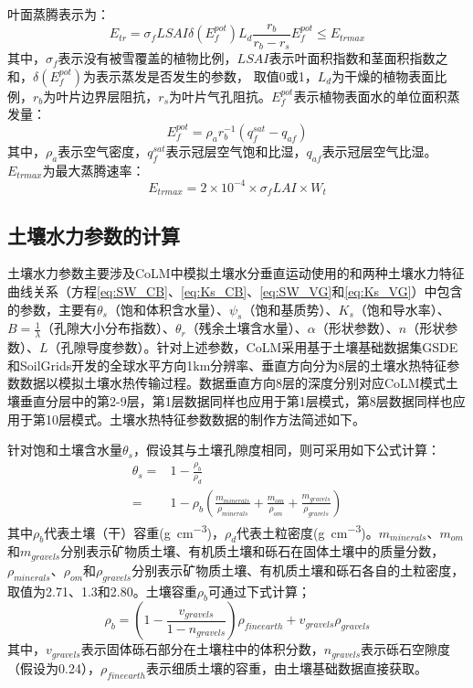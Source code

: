 叶面蒸腾表示为：
\begin{equation}
{E}_{{tr}}=\sigma_{{f}} LSAI \delta\left({E}_{{f}}^{{pot}}\right) {L}_{{d}} \frac{{r}_{{b}}}{{r}_{{b}}-{r}_{{s}}} {E}_{{f}}^{{pot}} \leq {E}_{{trmax}}
\end{equation}
其中，$\sigma_f$表示没有被雪覆盖的植物比例，$LSAI$表示叶面积指数和茎面积指数之和，$\delta\left(E_f^{pot}\right)$为表示蒸发是否发生的参数，
取值0或1，$L_d$为干燥的植物表面比例，$r_b$为叶片边界层阻抗，$r_s$为叶片气孔阻抗。$E_f^{pot}$表示植物表面水的单位面积蒸发量：
\begin{equation}
{E}_{{f}}^{{pot}}=\rho_{{a}} {r}_{{b}}^{-1}\left({q}_{{f}}^{{sat}}-{q}_{{af}}\right)
\end{equation}
其中，$\rho_a$表示空气密度，$q_f^{sat}$表示冠层空气饱和比湿，$q_{af}$表示冠层空气比湿。$E_{trmax}$为最大蒸腾速率：
\begin{equation}
{E}_{ {trmax }}=2 \times 10^{-4} \times \sigma_{{f}} L A I \times W_{t}
\end{equation}

\subsection{土壤水力参数的计算}\label{sec_hydropar}
土壤水力参数主要涉及CoLM中模拟土壤水分垂直运动使用的\citet{campbell1974}和\citet{van1980closed}两种土壤水力特征曲线关系（方程\ref{eq:SW_CB}、\ref{eq:Ks_CB}、\ref{eq:SW_VG}和\ref{eq:Ks_VG}）中包含的参数，主要有$\theta_s$（饱和体积含水量）、$\psi_s$（饱和基质势）、$K_s$（饱和导水率）、$B=\frac{1}{\lambda}$（孔隙大小分布指数）、$\theta_r$（残余土壤含水量）、$\alpha$（形状参数）、$n$（形状参数）、$L$（孔隙导度参数）。针对上述参数，CoLM采用基于土壤基础数据集GSDE和SoilGrids开发的全球水平方向1km分辨率、垂直方向分为8层的土壤水热特征参数数据以模拟土壤水热传输过程。数据垂直方向8层的深度分别对应CoLM模式土壤垂直分层中的第2-9层，第1层数据同样也应用于第1层模式，第8层数据同样也应用于第10层模式。土壤水热特征参数数据的制作方法简述如下。

针对饱和土壤含水量$\theta_s$，假设其与土壤孔隙度相同，则可采用如下公式计算：
\begin{equation}
    \begin{aligned}
        \theta_s =& 1-\frac{\rho_b}{\rho_d}\\
        =& 1-\rho_b\left(\frac{m_{minerals}}{\rho_{minerals}}+\frac{m_{om}}{\rho_{om}}+\frac{m_{gravels}}{\rho_{gravels}}\right)
    \end{aligned}
\end{equation}
其中$\rho_b$代表土壤（干）容重(\unit{g.cm^{-3}})，$\rho_d$代表土粒密度(\unit{g.cm^{-3}})。$m_{minerals}$、$m_{om}$和$m_{gravels}$分别表示矿物质土壤、有机质土壤和砾石在固体土壤中的质量分数，$\rho_{minerals}$、$\rho_{om}$和$\rho_{gravels}$分别表示矿物质土壤、有机质土壤和砾石各自的土粒密度，取值为2.71、1.3和2.80。土壤容重$\rho_b$可通过下式计算；$$\rho_b=\left(1-\frac{v_{gravels}}{1-n_{gravels}}\right)\rho_{fineearth}+v_{gravels}\rho_{gravels}$$
其中，$v_{gravels}$表示固体砾石部分在土壤柱中的体积分数，$n_{gravels}$表示砾石空隙度（假设为0.24），$\rho_{fineearth}$表示细质土壤的容重，由土壤基础数据直接获取。

